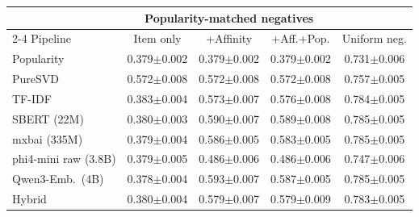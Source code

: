 \begin{tabular}{lcccc}
\toprule
 & \multicolumn{3}{c}{Popularity-matched negatives} & \\
\cmidrule(lr){2-4}
Pipeline & Item only & +Affinity & +Aff.+Pop. & Uniform neg. \\
\midrule
Popularity & 0.379$\pm$0.002 & 0.379$\pm$0.002 & 0.379$\pm$0.002 & 0.731$\pm$0.006 \\
PureSVD & 0.572$\pm$0.008 & 0.572$\pm$0.008 & 0.572$\pm$0.008 & 0.757$\pm$0.005 \\
\midrule
TF-IDF & 0.383$\pm$0.004 & 0.573$\pm$0.007 & 0.576$\pm$0.008 & 0.784$\pm$0.005 \\
SBERT (22M) & 0.380$\pm$0.003 & 0.590$\pm$0.007 & 0.589$\pm$0.008 & 0.785$\pm$0.005 \\
mxbai (335M) & 0.379$\pm$0.004 & 0.586$\pm$0.005 & 0.583$\pm$0.005 & 0.785$\pm$0.005 \\
phi4-mini raw (3.8B) & 0.379$\pm$0.005 & 0.486$\pm$0.006 & 0.486$\pm$0.006 & 0.747$\pm$0.006 \\
Qwen3-Emb.\ (4B) & 0.378$\pm$0.004 & 0.593$\pm$0.007 & 0.587$\pm$0.005 & 0.785$\pm$0.005 \\
Hybrid & 0.380$\pm$0.004 & 0.579$\pm$0.007 & 0.579$\pm$0.009 & 0.783$\pm$0.005 \\
\bottomrule
\end{tabular}
